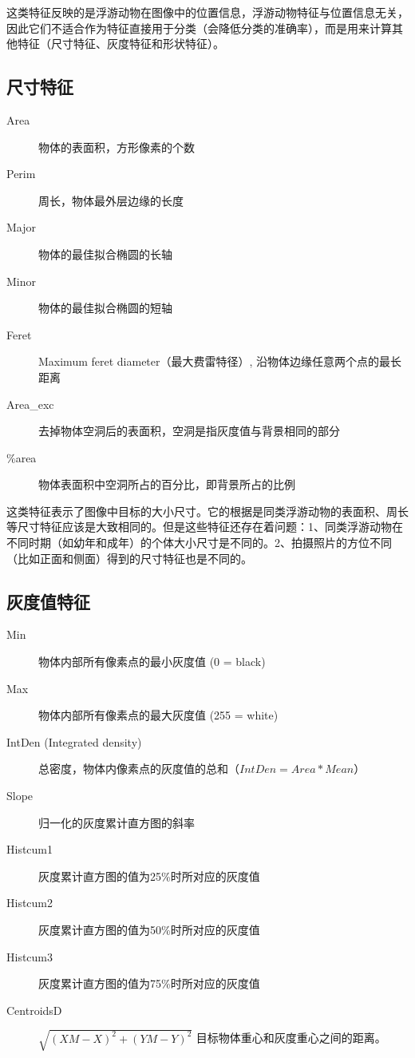 这类特征反映的是浮游动物在图像中的位置信息，浮游动物特征与位置信息无关，因此它们不适合作为特征直接用于分类（会降低分类的准确率），而是用来计算其他特征（尺寸特征、灰度特征和形状特征）。

\subsection{尺寸特征}

\begin{description}
\item[Area] 物体的表面积，方形像素的个数%
\item[Perim] 周长，物体最外层边缘的长度
\item[Major] 物体的最佳拟合椭圆的长轴%
\item[Minor] 物体的最佳拟合椭圆的短轴%
\item[Feret] Maximum feret diameter（最大费雷特径）, 沿物体边缘任意两个点的最长距离
\item[Area\_exc] 去掉物体空洞后的表面积，空洞是指灰度值与背景相同的部分
\item[\%area] 物体表面积中空洞所占的百分比，即背景所占的比例
\end{description}

这类特征表示了图像中目标的大小尺寸。它的根据是同类浮游动物的表面积、周长等尺寸特征应该是大致相同的。但是这些特征还存在着问题：1、同类浮游动物在不同时期（如幼年和成年）的个体大小尺寸是不同的。2、拍摄照片的方位不同（比如正面和侧面）得到的尺寸特征也是不同的。

\subsection{灰度值特征}

\begin{description}
    \item[Min] 物体内部所有像素点的最小灰度值 (0 = black)
    \item[Max] 物体内部所有像素点的最大灰度值 (255 = white)
    \item[IntDen (Integrated density)] 总密度，物体内像素点的灰度值的总和（$IntDen = Area * Mean$）
    \item[Slope] 归一化的灰度累计直方图的斜率
    \item[Histcum1] 灰度累计直方图的值为25\%时所对应的灰度值
    \item[Histcum2] 灰度累计直方图的值为50\%时所对应的灰度值
    \item[Histcum3] 灰度累计直方图的值为75\%时所对应的灰度值
    \item[CentroidsD] $\sqrt{(XM-X)^{2}+(YM-Y)^{2}}$ 目标物体重心和灰度重心之间的距离。
\end{description}

